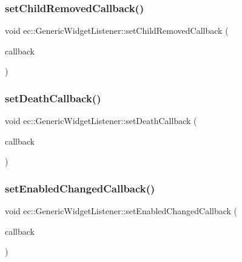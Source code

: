 \subsubsection{\texorpdfstring{set\+Child\+Removed\+Callback()}{setChildRemovedCallback()}}
{\footnotesize\ttfamily void ec\+::\+Generic\+Widget\+Listener\+::set\+Child\+Removed\+Callback (\begin{DoxyParamCaption}\item[{const \mbox{\hyperlink{classec_1_1_generic_widget_listener_a8b00b7a94ee023680c4af876a5b5a4a5}{Child\+Removed\+\_\+\+Callback}} \&}]{callback }\end{DoxyParamCaption})}

\mbox{\label{classec_1_1_generic_widget_listener_a2098b05bce52309779603a5711306615}} 
\subsubsection{\texorpdfstring{set\+Death\+Callback()}{setDeathCallback()}}
{\footnotesize\ttfamily void ec\+::\+Generic\+Widget\+Listener\+::set\+Death\+Callback (\begin{DoxyParamCaption}\item[{const \mbox{\hyperlink{classec_1_1_generic_widget_listener_a9fbdf208fb605a8f9bcaf6f84246118f}{Death\+\_\+\+Callback}} \&}]{callback }\end{DoxyParamCaption})}

\mbox{\label{classec_1_1_generic_widget_listener_aa6e50d4202cfd4899ffb4d618750b8de}} 
\subsubsection{\texorpdfstring{set\+Enabled\+Changed\+Callback()}{setEnabledChangedCallback()}}
{\footnotesize\ttfamily void ec\+::\+Generic\+Widget\+Listener\+::set\+Enabled\+Changed\+Callback (\begin{DoxyParamCaption}\item[{const \mbox{\hyperlink{classec_1_1_generic_widget_listener_aa45e97274cfc832de2b027f94aeaa4c5}{Enabled\+Changed\+\_\+\+Callback}} \&}]{callback }\end{DoxyParamCaption})}

